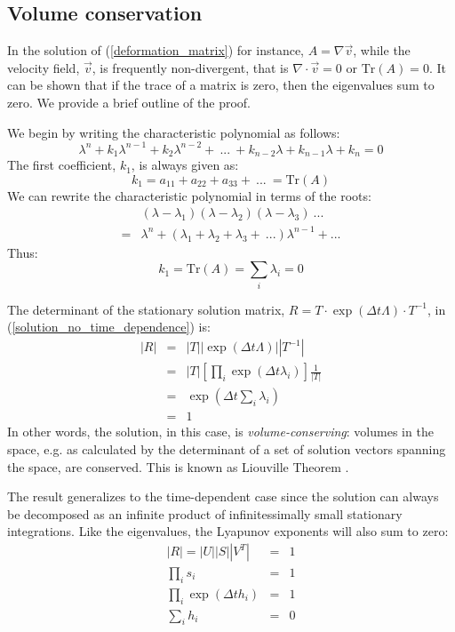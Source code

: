 \documentclass[11pt]{article}
\begin{document}
\subsection{Volume conservation}

In the solution of (\ref{deformation_matrix}) for instance, 
$A=\nabla \vec v$, while the velocity field, $\vec v$, is frequently non-divergent,
that is $\nabla \cdot \vec v=0$ or $\mathrm{Tr}(A)=0$.
It can be shown that 
if the trace of a matrix is zero, then the eigenvalues sum to zero.
We provide a brief outline of the proof.

We begin by writing the characteristic polynomial as follows:
\begin{equation}
  \lambda^n + k_1 \lambda^{n-1} + k_2 \lambda^{n-2} + ~... ~
  + k_{n-2} \lambda + k_{n-1} \lambda + k_n = 0
\end{equation}
The first coefficient, $k_1$, is always given as:
\begin{equation}
	k_1 = a_{11} + a_{22} + a_{33} + ~ ... ~ = \mathrm{Tr}(A)
\end{equation}
We can rewrite the characteristic polynomial
in terms of the roots:
\begin{eqnarray}
	& (\lambda - \lambda_1)(\lambda - \lambda_2)(\lambda-\lambda_3) ~ ... \\
	= & \lambda^n + (\lambda_1 + \lambda_2 + \lambda_3 + ~ ...) \lambda^{n-1} + ...
\end{eqnarray}
Thus:
\begin{equation}
	k_1 = \mathrm{Tr}(A) = \sum_i \lambda_i = 0
\end{equation}

The determinant of the stationary solution matrix,
$R=T\cdot\exp(\Delta t\Lambda)\cdot T^{-1}$, in (\ref{solution_no_time_dependence}) is:
\begin{eqnarray}
	|R| & = & |T||\exp(\Delta t\Lambda)||T^{-1}| \\
	    & = & |T| \left [ \prod_i \exp(\Delta t \lambda_i) \right ] \frac{1}{|T|} \\
& = & \exp\left(\Delta t \sum_i \lambda_i\right) \\
& = & 1
\end{eqnarray}
In other words, the solution, in this case, is {\it volume-conserving}:
volumes in the space, e.g. as calculated by the determinant of a set of 
solution vectors
spanning the space, are conserved.  
This is known as Liouville Theorem \citep{Thornton2003}.

The result generalizes to the time-dependent case since the solution can
always be decomposed as an infinite product of infinitessimally small 
stationary integrations.
Like the eigenvalues, the Lyapunov exponents will also sum to zero:
\begin{eqnarray}
|R| =	|U||S||V^T| & = & 1 \\
	\prod_i s_i & = & 1 \\
	\prod_i \exp(\Delta t h_i) & = & 1 \\
	\sum_i h_i & = & 0
\end{eqnarray}
\end{document}
